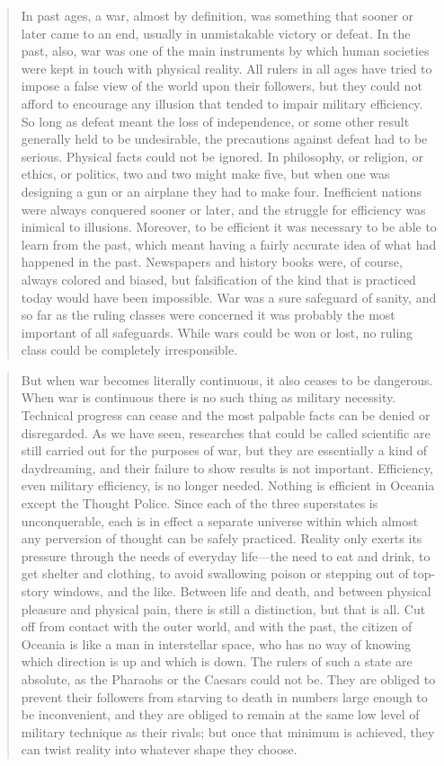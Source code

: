 \begin{quotation}
In past ages, a war, almost by definition, was something that sooner or
later came to an end, usually in unmistakable victory or defeat. In the
past, also, war was one of the main instruments by which human societies
were kept in touch with physical reality. All rulers in all ages have
tried to impose a false view of the world upon their followers, but they
could not afford to encourage any illusion that tended to impair
military efficiency. So long as defeat meant the loss of independence,
or some other result generally held to be undesirable, the precautions
against defeat had to be serious. Physical facts could not be ignored.
In philosophy, or religion, or ethics, or politics, two and two might
make five, but when one was designing a gun or an airplane they had to
make four. Inefficient nations were always conquered sooner or later,
and the struggle for efficiency was inimical to illusions. Moreover, to
be efficient it was necessary to be able to learn from the past, which
meant having a fairly accurate idea of what had happened in the past.
Newspapers and history books were, of course, always colored and biased,
but falsification of the kind that is practiced today would have been
impossible. War was a sure safeguard of sanity, and so far as the ruling
classes were concerned it was probably the most important of all
safeguards. While wars could be won or lost, no ruling class could be
completely irresponsible.
\end{quotation}

\begin{quotation}
But when war becomes literally continuous, it also ceases to be
dangerous. When war is continuous there is no such thing as military
necessity. Technical progress can cease and the most palpable facts can
be denied or disregarded. As we have seen, researches that could be
called scientific are still carried out for the purposes of war, but
they are essentially a kind of daydreaming, and their failure to show
results is not important. Efficiency, even military efficiency, is no
longer needed. Nothing is efficient in Oceania except the Thought
Police. Since each of the three superstates is unconquerable, each is in
effect a separate universe within which almost any perversion of thought
can be safely practiced. Reality only exerts its pressure through the
needs of everyday life---the need to eat and drink, to get shelter and
clothing, to avoid swallowing poison or stepping out of top-story
windows, and the like. Between life and death, and between physical
pleasure and physical pain, there is still a distinction, but that is
all. Cut off from contact with the outer world, and with the past, the
citizen of Oceania is like a man in interstellar space, who has no way
of knowing which direction is up and which is down. The rulers of such a
state are absolute, as the Pharaohs or the Caesars could not be. They
are obliged to prevent their followers from starving to death in numbers
large enough to be inconvenient, and they are obliged to remain at the
same low level of military technique as their rivals; but once that
minimum is achieved, they can twist reality into whatever shape they
choose.
\end{quotation}


